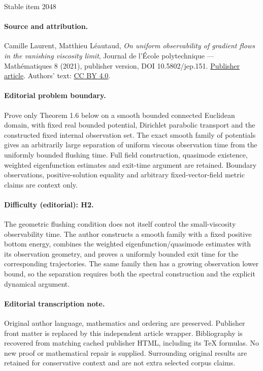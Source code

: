 \documentclass[11pt]{article}
\numberwithin{equation}{section}
\theoremstyle{definition}
\begin{document}
\begin{center}{\Large Stable item 2048}\end{center}
\paragraph{Source and attribution.}
Camille Laurent, Matthieu Léautaud, \emph{On uniform observability of gradient flows in the vanishing viscosity limit}, Journal de l’École polytechnique — Mathématiques 8 (2021), publisher version, DOI 10.5802/jep.151. \href{https://jep.centre-mersenne.org/articles/10.5802/jep.151/}{Publisher article}. Authors' text: \href{https://creativecommons.org/licenses/by/4.0/}{CC BY 4.0}.
\paragraph{Editorial problem boundary.}
Prove only Theorem 1.6 below on a smooth bounded connected Euclidean domain, with fixed real bounded potential, Dirichlet parabolic transport and the constructed fixed internal observation set. The exact smooth family of potentials gives an arbitrarily large separation of uniform viscous observation time from the uniformly bounded flushing time. Full field construction, quasimode existence, weighted eigenfunction estimates and exit-time argument are retained. Boundary observations, positive-solution equality and arbitrary fixed-vector-field metric claims are context only.
\paragraph{Difficulty (editorial): H2.}
The geometric flushing condition does not itself control the small-viscosity observability time. The author constructs a smooth family with a fixed positive bottom energy, combines the weighted eigenfunction/quasimode estimates with its observation geometry, and proves a uniformly bounded exit time for the corresponding trajectories. The same family then has a growing observation lower bound, so the separation requires both the spectral construction and the explicit dynamical argument.
\paragraph{Editorial transcription note.}
Original author language, mathematics and ordering are preserved. Publisher front matter is replaced by this independent article wrapper. Bibliography is recovered from matching cached publisher HTML, including its TeX formulas. No new proof or mathematical repair is supplied. Surrounding original results are retained for conservative context and are not extra selected corpus claims.
\clearpage
\end{document}
